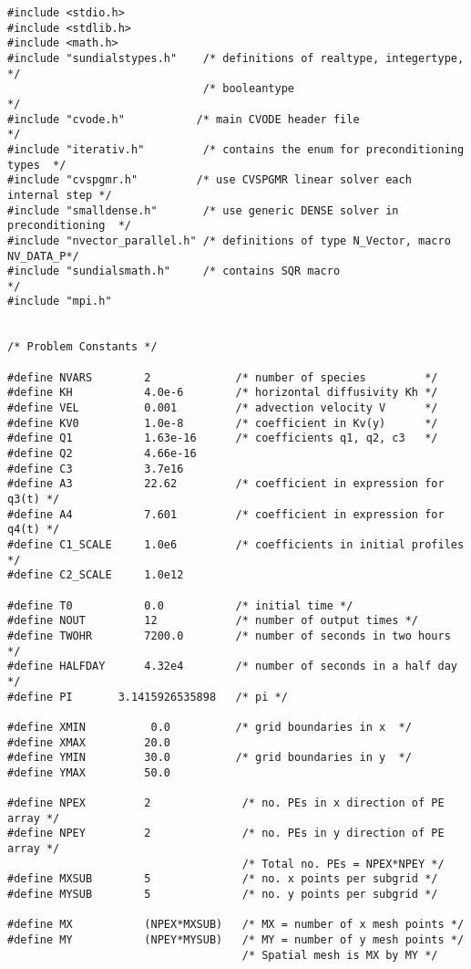 \begin{verbatim}
#include <stdio.h>
#include <stdlib.h>
#include <math.h>
#include "sundialstypes.h"    /* definitions of realtype, integertype,        */
                              /* booleantype                                  */
#include "cvode.h"           /* main CVODE header file                       */
#include "iterativ.h"         /* contains the enum for preconditioning types  */
#include "cvspgmr.h"         /* use CVSPGMR linear solver each internal step */
#include "smalldense.h"       /* use generic DENSE solver in preconditioning  */
#include "nvector_parallel.h" /* definitions of type N_Vector, macro NV_DATA_P*/
#include "sundialsmath.h"     /* contains SQR macro                           */
#include "mpi.h"


/* Problem Constants */

#define NVARS        2             /* number of species         */
#define KH           4.0e-6        /* horizontal diffusivity Kh */
#define VEL          0.001         /* advection velocity V      */
#define KV0          1.0e-8        /* coefficient in Kv(y)      */
#define Q1           1.63e-16      /* coefficients q1, q2, c3   */ 
#define Q2           4.66e-16
#define C3           3.7e16
#define A3           22.62         /* coefficient in expression for q3(t) */
#define A4           7.601         /* coefficient in expression for q4(t) */
#define C1_SCALE     1.0e6         /* coefficients in initial profiles    */
#define C2_SCALE     1.0e12

#define T0           0.0           /* initial time */
#define NOUT         12            /* number of output times */
#define TWOHR        7200.0        /* number of seconds in two hours  */
#define HALFDAY      4.32e4        /* number of seconds in a half day */
#define PI       3.1415926535898   /* pi */ 

#define XMIN          0.0          /* grid boundaries in x  */
#define XMAX         20.0           
#define YMIN         30.0          /* grid boundaries in y  */
#define YMAX         50.0

#define NPEX         2              /* no. PEs in x direction of PE array */
#define NPEY         2              /* no. PEs in y direction of PE array */
                                    /* Total no. PEs = NPEX*NPEY */
#define MXSUB        5              /* no. x points per subgrid */
#define MYSUB        5              /* no. y points per subgrid */

#define MX           (NPEX*MXSUB)   /* MX = number of x mesh points */
#define MY           (NPEY*MYSUB)   /* MY = number of y mesh points */
                                    /* Spatial mesh is MX by MY */


\end{verbatim}
